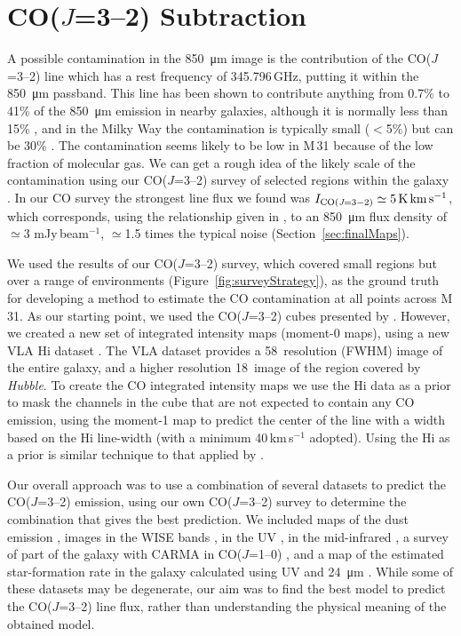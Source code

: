 \documentclass[a4paper,fleqn,usenatbib, twocolumn]{aastex63}
\begin{document}
\section{CO($J$=3--2) Subtraction}
\label{sec:CO}

A possible contamination in the \SI{850}{\micro\meter} image is the contribution of the CO($J$=3--2) line which has a rest frequency of 345.796\,GHz, putting it within the \SI{850}{\micro\meter} passband. This line has been shown to contribute anything from 0.7\% to 41\% of the \SI{850}{\micro\meter} emission 
in nearby galaxies, although it is normally less than 15\% \citep{Smith2019}, and in the Milky Way the contamination
is typically small ($<$5\%) but can be 30\% \citep{Moore2015}. The contamination seems likely to be low in M\,31 because of the low fraction of molecular gas. We can get a rough idea of the likely
scale of the contamination using our CO($J$=3--2) survey of selected
regions within the galaxy \citep{Li2020}. In our
CO survey the strongest line flux we found was
$I_{\rm CO(\textit{J}=3-2)} \simeq 5\,{\rm K\,km\,s^{-1}}$, which
corresponds, using the relationship given in \citet{Parsons2018}, to an \SI{850}{\micro\meter} flux density
of $\simeq$3 mJy\,beam$^{-1}$, $\simeq$1.5 times the typical noise
(Section~\ref{sec:finalMaps}).

We used the results of our CO($J$=3--2) survey, which covered
small regions but over a range of environments (Figure~\ref{fig:surveyStrategy}), as the ground truth for developing a method to estimate
the CO contamination at all points across M\,31. As our starting point, we used
the CO($J$=3--2) cubes presented by \citet{Li2020}.
However, we created a new set of integrated intensity maps (moment-0 maps), using a
new VLA H{\sc i} dataset \citep{Koch2021}. The VLA dataset provides a 58\arcsec\ resolution (FWHM) image of the entire galaxy, and a higher resolution
18\arcsec\ image of the region covered by \textit{Hubble}. To create the CO integrated intensity maps we use the H{\sc i} data as a prior to mask the channels
in the cube that are not expected to contain any CO emission, using the moment-1 map to predict the center of the line with a width based on the H{\sc i} line-width  (with a minimum 40\,km\,s$^{-1}$ adopted). Using the H{\sc i} as a prior is similar technique to that applied by \citet{Schruba2011}. 

Our overall approach was to use a combination of
several datasets to predict the CO($J$=3--2) emission, using our own CO($J$=3--2) survey to determine the combination that gives the best prediction. 
We included maps of the
dust emission \citep[column-density, temperature, and emissivity index;][]{Whitworth2019}, images in the WISE bands \citep{Wright2010,Cutri2013}, 
in the UV \citep{Thilker2005}, in the mid-infrared \citep[{\it Spitzer}, MIPS;][]{gordon2006}, a survey of part
of the galaxy with CARMA in CO($J$=1--0) \citep[][A.~Schruba et al., \textit{in preparation}]{CalduPrimo2016}, and a map of the
estimated star-formation rate in the galaxy calculated using UV and \SI{24}{\micro\meter} \citep{ford2013}. 
While some of these datasets may be degenerate, our aim was to find the best model to predict the CO($J$=3--2) line flux, rather than understanding
the physical meaning of the obtained model.
\end{document}
